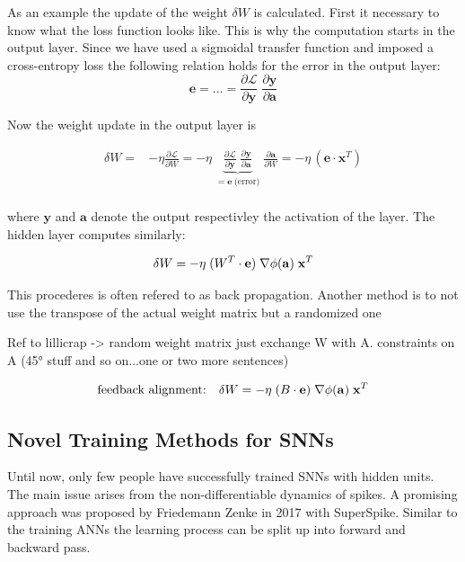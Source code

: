 As an example the update of the weight $\delta W$ is calculated. First it necessary to know what the loss function looks like. This is why the computation starts in the output layer. Since we have used a sigmoidal transfer function and imposed a cross-entropy loss the following relation holds for the error in the output layer:
\begin{equation}
\mathbf{e} = ... = \frac{\partial\mathcal{L}}{\partial \mathbf{y}} \;	\frac{\partial \mathbf{y}}{\partial \mathbf{a} }
\end{equation}

Now the weight update in the output layer is

\begin{align}
\delta W =& - \eta \frac{\partial \mathcal{L}}{\partial W} 
= - \eta \;
\underbrace{\frac{\partial\mathcal{L}}{\partial \mathbf{y}} \;
	\frac{\partial \mathbf{y}}{\partial \mathbf{a} }}_{=\mathbf{e}\; \text{(error)}} \;
\frac{\partial \mathbf{a}}{\partial W}
= - \eta \, (\mathbf{e} \cdot \mathbf{x}^T)\\
\end{align}

where $\mathbf{y}$ and $\mathbf{a}$ denote the output respectivley the activation of the layer. The hidden layer computes similarly:

\begin{equation}
\delta W = - \eta \;
(W^T \cdot \mathbf{e}) \;
\nabla \phi(\mathbf{a}) \;
\mathbf{x}^T\\
\end{equation}

This procederes is often refered to as back propagation. Another method is to not use the transpose of the actual weight matrix but a randomized one 

Ref to lillicrap -> random weight matrix just exchange W with A. constraints on A (45° stuff and so on...one or two more sentences)

\begin{equation}
\text{feedback alignment:} \quad \delta W = - \eta \;
(B \cdot \mathbf{e}) \;
\nabla \phi(\mathbf{a}) \;
\mathbf{x}^T\;\\
\end{equation}

\subsection{Novel Training Methods for SNNs}

Until now, only few people have successfully trained SNNs with hidden units. The main issue arises from the non-differentiable dynamics of spikes. A promising approach was proposed by Friedemann Zenke in 2017 with SuperSpike. Similar to the training ANNs the learning process can be split up into forward and backward pass. 


